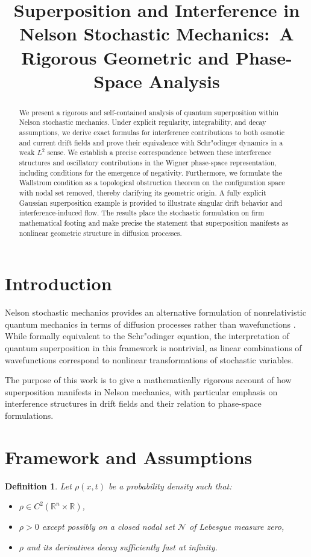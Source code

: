 \documentclass[11pt]{article}
\title{Superposition and Interference in Nelson Stochastic Mechanics:\
A Rigorous Geometric and Phase-Space Analysis}
\author{ }
\date{}
\newtheorem{definition}[theorem]{Definition}
\begin{document}
\maketitle

\begin{abstract}
We present a rigorous and self-contained analysis of quantum superposition within Nelson stochastic mechanics. Under explicit regularity, integrability, and decay assumptions, we derive exact formulas for interference contributions to both osmotic and current drift fields and prove their equivalence with Schr"odinger dynamics in a weak $L^2$ sense. We establish a precise correspondence between these interference structures and oscillatory contributions in the Wigner phase-space representation, including conditions for the emergence of negativity. Furthermore, we formulate the Wallstrom condition as a topological obstruction theorem on the configuration space with nodal set removed, thereby clarifying its geometric origin. A fully explicit Gaussian superposition example is provided to illustrate singular drift behavior and interference-induced flow. The results place the stochastic formulation on firm mathematical footing and make precise the statement that superposition manifests as nonlinear geometric structure in diffusion processes.
\end{abstract}

\section{Introduction}
Nelson stochastic mechanics provides an alternative formulation of nonrelativistic quantum mechanics in terms of diffusion processes rather than wavefunctions \cite{nelson}. While formally equivalent to the Schr"odinger equation, the interpretation of quantum superposition in this framework is nontrivial, as linear combinations of wavefunctions correspond to nonlinear transformations of stochastic variables.

The purpose of this work is to give a mathematically rigorous account of how superposition manifests in Nelson mechanics, with particular emphasis on interference structures in drift fields and their relation to phase-space formulations.

\section{Framework and Assumptions}

\begin{definition}
Let $\rho(x,t)$ be a probability density such that:
\begin{itemize}
\item $\rho \in C^2(\mathbb{R}^n \times \mathbb{R})$,
\item $\rho > 0$ except possibly on a closed nodal set $\mathcal{N}$ of Lebesgue measure zero,
\item $\rho$ and its derivatives decay sufficiently fast at infinity.
\end{itemize}
\end{definition}
\end{document}
